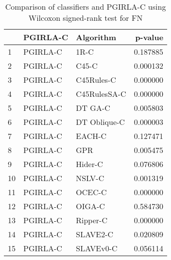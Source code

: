\begin{table}
\footnotesize
\caption{Comparison of classifiers and PGIRLA-C using Wilcoxon signed-rank test for FN}
\label{tab:PGIRLA-C wilcoxon FN comparison}
\begin{tabular}{lllr}
\hline
 & PGIRLA-C & Algorithm & p-value \\
\hline
1 & PGIRLA-C & 1R-C & 0.187885 \\
2 & PGIRLA-C & C45-C & 0.000132 \\
3 & PGIRLA-C & C45Rules-C & 0.000000 \\
4 & PGIRLA-C & C45RulesSA-C & 0.000000 \\
5 & PGIRLA-C & DT GA-C & 0.005803 \\
6 & PGIRLA-C & DT Oblique-C & 0.000003 \\
7 & PGIRLA-C & EACH-C & 0.127471 \\
8 & PGIRLA-C & GPR & 0.005475 \\
9 & PGIRLA-C & Hider-C & 0.076806 \\
10 & PGIRLA-C & NSLV-C & 0.001319 \\
11 & PGIRLA-C & OCEC-C & 0.000000 \\
12 & PGIRLA-C & OIGA-C & 0.584730 \\
13 & PGIRLA-C & Ripper-C & 0.000000 \\
14 & PGIRLA-C & SLAVE2-C & 0.020809 \\
15 & PGIRLA-C & SLAVEv0-C & 0.056114 \\
\hline
\end{tabular}
\end{table}

